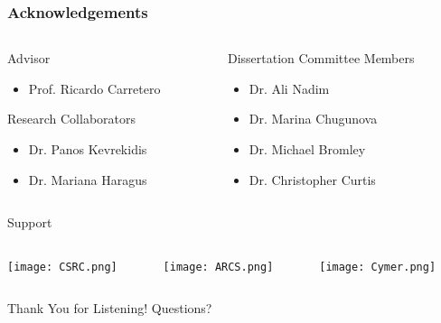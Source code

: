 \begin{frame}
\frametitle{Acknowledgements}
\begin{columns}
\begin{column}{0.5\textwidth}
Advisor 
\begin{itemize}
\item Prof. Ricardo Carretero 
\end{itemize}

Research Collaborators 
\begin{itemize}
\item Dr. Panos Kevrekidis
\item Dr. Mariana Haragus
\end{itemize}
\end{column}
\begin{column}{0.5\textwidth}
Dissertation Committee Members
\begin{itemize}
\item Dr. Ali Nadim
\item Dr. Marina Chugunova
\item Dr. Michael Bromley
\item Dr. Christopher Curtis 
\end{itemize}
\end{column}
\end{columns}
Support
\begin{columns}
\begin{column}{0.3\textwidth}
\centering 
\texttt{[image: CSRC.png]}
\end{column}
\begin{column}{0.3\textwidth}
\centering
\texttt{[image: ARCS.png]}
\end{column}
\begin{column}{0.3\textwidth}
\centering
\texttt{[image: Cymer.png]}
\end{column}
\end{columns}

\begin{alertblock} {Thank You for Listening!}
  Questions? 
\end{alertblock}
\end{frame}

